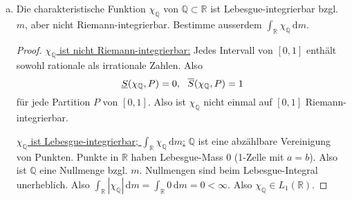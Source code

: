 \documentclass[10pt]{article}\usepackage[]{graphicx}\usepackage[]{color}
\newcommand{\N}{\mathbb{N}}
\newcommand{\Q}{\mathbb{Q}}
\newcommand{\R}{\mathbb{R}}
\newcommand{\df}{\,\textrm{d}}
\begin{document}
\begin{enumerate}[(a)]
\begin{proof}
    \uline{$f$ ist nicht Lebesgue-integrierbar bzgl.\ $m$:}
    Für stetige Funktionen auf einem kompakten Intervall
    stimmen das Rieman- und das Lebesgue-Integral überein:
    $\int_{[0, t]} |f| \df m = \int_0^t |f(x)| \df x$.
    Berechne für $k \in \N_{\geq 1}$:
    \begin{align*}
    \int_0^{k\pi} \left|\frac{\sin(x)}{x}\right| \df x
    &= \int_0^{\pi} \left|\frac{\sin(x)}{x}\right| \df x +
       \int_{\pi}^{2\pi} \left|\frac{\sin(x)}{x}\right| \df x +
       \dots +
       \int_{(k-1)\pi}^{k\pi} \left|\frac{\sin(x)}{x}\right| \df x \\
    &\geq \frac{1}{\pi}\int_0^{\pi} |\sin(x)| \df x +
       \frac{1}{2\pi}\int_{\pi}^{2\pi} |\sin(x)| \df x +
       \dots +
       \frac{1}{k\pi}\int_{(k-1)\pi}^{k\pi} |\sin(x)| \df x \\
    &\geq \frac{1}{\pi}\int_0^{\pi} \sin(x) \df x +
       \frac{1}{2\pi}\int_{\pi}^{2\pi} \sin(x) \df x +
       \dots +
       \frac{1}{k\pi}\int_{(k-1)\pi}^{k\pi} \sin(x) \df x.
    \end{align*}
    Da $\int_{n\pi}^{(n+1)\pi} \sin(x) \df x = \int_{0}^{\pi} \sin(x) \df x = 2$ für alle $n \in \N$:
    \[
     \int_0^{k\pi} \left|\frac{\sin(x)}{x}\right| \df x \geq \frac{2}{\pi}\sum_{i=1}^n\frac{1}{i}.
    \]
    Für $k \to \infty$ erhalten wir eine Reihe von
    Integralen, die durch die harmonische Reihe minorisiert wird
    und folglich divergiert. Folglich $f \notin L_1(\R)$.
    Folglich ist das Lebesgue-Integral von $f$ über $\R$ bzgl.\ $m$
    nicht definiert (siehe Def.\ 3.1).
  \end{proof}

\item Die charakteristische Funktion $\chi_{\Q}$ von $\Q \subset \R$
ist Lebesgue-integrierbar bzgl.\ $m$, aber nicht Riemann-integrierbar.
Bestimme ausserdem $\int_{\R} \chi_{\Q} \df m$.
  \begin{proof}
  \uline{$\chi_{\Q}$ ist nicht Riemann-integrierbar:}
  Jedes Intervall von $[0,1]$ enthält sowohl rationale als irrationale
  Zahlen. Also
  \[
    \uline{S}(\chi_{\Q}, P) = 0,~~
    \overline{S}(\chi_{\Q}, P) = 1
  \]
  für jede Partition $P$ von $[0,1]$.
  Also ist $\chi_{\Q}$ nicht einmal auf $[0,1]$
  Riemann-integrierbar.

  \uline{$\chi_{\Q}$ ist Lebesgue-integrierbar; $\int_{\R} \chi_{\Q} \df m$:}
  $\Q$ ist eine abzählbare Vereinigung von Punkten.
  Punkte in $\R$ haben Lebesgue-Mass 0 (1-Zelle mit $a = b$).
  Also ist $\Q$ eine Nullmenge bzgl. $m$.
  Nullmengen sind beim Lebesgue-Integral unerheblich.
  Also $\int_{\R} |\chi_{\Q}| \df m = \int_{\R} 0 \df m = 0 < \infty$. Also $\chi_{\Q} \in L_1(\R)$.
  \end{proof}
\end{enumerate}
\end{document}
